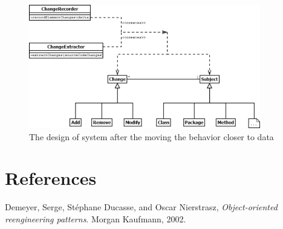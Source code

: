 \documentclass[a4paper]{article}
\begin{document}
\begin{figure}[h]
\centering
\includegraphics[width=0.9\textwidth]{Images/behaviorToData}
\caption{The design of system after the moving the behavior closer to data}
\label{fig:behaviorToData}
\end{figure}


\newpage
\section{References}
\begin{thebibliography}{9}

	Demeyer, Serge, St{\'e}phane Ducasse, and Oscar Nierstrasz,
	\emph{Object-oriented reengineering patterns}. 
	Morgan Kaufmann, 
	2002.

\end{thebibliography}
\end{document}
